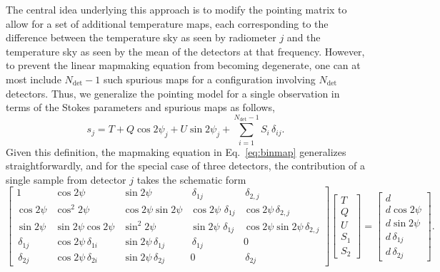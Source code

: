 \documentclass[twocolumn]{aa}
\begin{document}
The central idea underlying this approach is to modify the pointing
matrix to allow for a set of additional temperature maps, each
corresponding to the difference between the temperature sky as seen by
radiometer $j$ and the temperature sky as seen by the mean of the
detectors at that frequency. However, to prevent the linear mapmaking
equation from becoming degenerate, one can at most include
$N_{\mathrm{det}}-1$ such spurious maps for a configuration involving
$N_{\mathrm{det}}$ detectors. Thus, we generalize the pointing model
for a single observation in terms of the Stokes parameters and
spurious maps as follows,
\begin{equation}
s_{j} = T + Q\cos2\psi_j + U\sin2\psi_j +
\sum_{i=1}^{N_{\mathrm{det}}-1}S_i \,\delta_{ij}. 
\end{equation}
Given this definition, the mapmaking equation in Eq.~\eqref{eq:binmap}
generalizes straightforwardly, and for the special case of three
detectors, the contribution of a single sample from detector $j$ takes
the schematic form
{\fontsize{5.3}{4}\selectfont
\begin{equation}
  \left[\begin{array}{ccccc}
      1 & \cos 2\psi & \sin 2\psi & \,\delta_{1j} & \,\delta_{2,j} \\
      \cos 2\psi & \cos^2 2\psi & \cos 2\psi \sin 2\psi & \cos 2\psi\,
      \,\delta_{1j} & \cos 2\psi\,\delta_{2,j} \\
      \sin 2\psi & \sin 2\psi\cos 2\psi & \sin^2 2\psi & \sin 2\psi\,
      \,\delta_{1j} & \cos 2\psi\sin 2\psi\,\delta_{2,j} \\
      \,\delta_{1j} & \cos 2\psi\,\delta_{1i} & \sin 2\psi\,\delta_{1j} & \,\delta_{1j} & 0 \\
      \,\delta_{2j} & \cos 2\psi\,\delta_{2i} & \sin 2\psi\,\delta_{2j} & 0 & \,\delta_{2j}
    \end{array}\right]
  \left[\begin{array}{c}
      T \\ Q \\ U \\ S_1 \\ S_2
    \end{array}\right]
  =
  \left[\begin{array}{c}
      d \\ d\cos 2\psi  \\ d\sin 2\psi  \\ d\,\delta_{1j} \\ d\,\delta_{2j}
    \end{array}\right].
  \label{eq:Smap}
\end{equation}
}\normalfont
\end{document}
